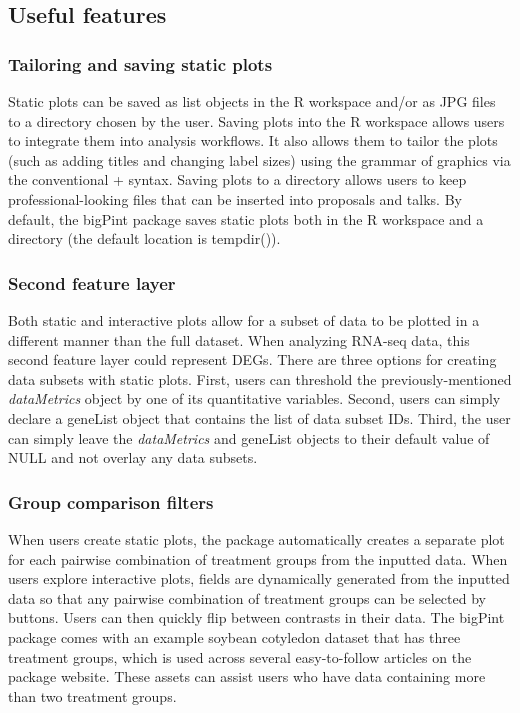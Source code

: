 \documentclass[parskip=full]{bmcart} %
\begin{document}
\subsection*{Useful features}

\subsubsection*{Tailoring and saving static plots}

Static plots can be saved as list objects in the R workspace and/or as JPG files to a directory chosen by the user. Saving plots into the R workspace allows users to integrate them into analysis workflows. It also allows them to tailor the plots (such as adding titles and changing label sizes) using the grammar of graphics via the conventional + syntax. Saving plots to a directory allows users to keep professional-looking files that can be inserted into proposals and talks. By default, the bigPint package saves static plots both in the R workspace and a directory (the default location is tempdir()).

\subsubsection*{Second feature layer}

Both static and interactive plots allow for a subset of data to be plotted in a different manner than the full dataset. When analyzing RNA-seq data, this second feature layer could represent DEGs. There are three options for creating data subsets with static plots. First, users can threshold the previously-mentioned \textit{dataMetrics} object by one of its quantitative variables. Second, users can simply declare a geneList object that contains the list of data subset IDs. Third, the user can simply leave the \textit{dataMetrics} and geneList objects to their default value of NULL and not overlay any data subsets.

\subsubsection*{Group comparison filters}

When users create static plots, the package automatically creates a separate plot for each pairwise combination of treatment groups from the inputted data. When users explore interactive plots, fields are dynamically generated from the inputted data so that any pairwise combination of treatment groups can be selected by buttons. Users can then quickly flip between contrasts in their data. The bigPint package comes with an example soybean cotyledon dataset that has three treatment groups, which is used across several easy-to-follow articles on the package website. These assets can assist users who have data containing more than two treatment groups. 
\end{document}
